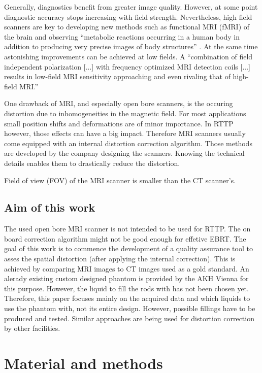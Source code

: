 \documentclass[parskip,bibtotoc,final,twoside=false,titlepage,a4paper,english,12pt,titlepage,a4paper]{scrbook}
\begin{document}
Generally, diagnostics benefit from greater image quality. However, at some point diagnostic accuracy stops increasing with field strength.
Nevertheless, high field scanners are key to developing new methods such as functional MRI (fMRI) of the brain \cite{Duyn2012} and observing
``metabolic reactions occurring in a human body in addition to producing very precise images of body structures'' \cite{Wada2010}.
At the same time astonishing improvements can be achieved at low fields.
A ``combination of field independent polarization [...] with frequency optimized MRI detection coils [...] results in low-field MRI sensitivity approaching and even rivaling that of high-field MRI.'' \cite{Coffey2013}

One drawback of MRI, and especially open bore scanners, is the occuring distortion due to inhomogeneities in the magnetic field.
For most applications small position shifts and deformations are of minor importance. In RTTP however, those effects can have a big impact.
Therefore MRI scanners usually come equipped with an internal distortion correction algorithm.
Those methods are developed by the company designing the scanners. Knowing the technical details enables them to drastically reduce the distortion.

Field of view (FOV) of the MRI scanner is smaller than the CT scanner's.

\section{Aim of this work}
The used open bore MRI scanner is not intended to be used for RTTP. The on board correction algorithm might not be good enough for effetive EBRT.
The goal of this work is to commence the development of a quality assurance tool to asses the spatial distortion (after applying the internal correction).
This is achieved by comparing MRI images to CT images used as a gold standard.
An alerady existing custom designed phantom is provided by the AKH Vienna for this purpose.
However, the liquid to fill the rods with has not been chosen yet.
Therefore, this paper focuses mainly on the acquired data and which liquids to use the phantom with, not its entire design.
However, possible fillings have to be produced and tested.
Similar approaches are being used for distortion correction by other facilities. \cite{Price2015, Petersch2004, Torfeh2015, Wang2004, Wang2004b, Mizowaki2000}

\chapter{Material and methods}
\end{document}
